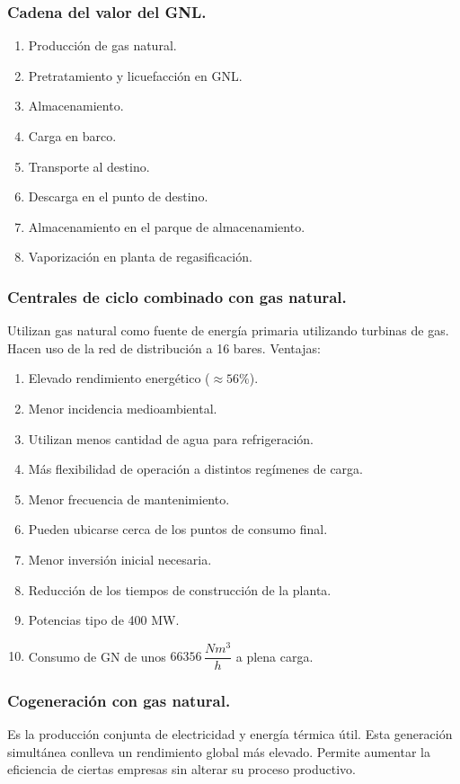 		\subsubsection{Cadena del valor del GNL.}
			\begin{enumerate}
				\item Producción de gas natural.
				\item Pretratamiento y licuefacción en GNL.
				\item Almacenamiento.
				\item Carga en barco.
				\item Transporte al destino.
				\item Descarga en el punto de destino.
				\item Almacenamiento en el parque de almacenamiento.
				\item Vaporización en planta de regasificación.
			\end{enumerate}
				
		\subsubsection{Centrales de ciclo combinado con gas natural.}
			Utilizan gas natural como fuente de energía primaria utilizando turbinas de gas. Hacen uso de la red de distribución a 16 bares. Ventajas:
			\begin{enumerate}
				\item Elevado rendimiento energético ($\approx 56\%$).
				\item Menor incidencia medioambiental.
				\item Utilizan menos cantidad de agua para refrigeración.
				\item Más flexibilidad de operación a distintos regímenes de carga.
				\item Menor frecuencia de mantenimiento.
				\item Pueden ubicarse cerca de los puntos de consumo final.
				\item Menor inversión inicial necesaria.
				\item Reducción de los tiempos de construcción de la planta.
				\item Potencias tipo de 400 MW.
				\item Consumo de GN de unos $66356\,\dfrac{Nm^3}{h}$ a plena carga.
			\end{enumerate}
			
		\subsubsection{Cogeneración con gas natural.}
			Es la producción conjunta de electricidad y energía térmica útil. Esta generación simultánea conlleva un rendimiento global más elevado. Permite aumentar la eficiencia de ciertas empresas sin alterar su proceso productivo.
			
